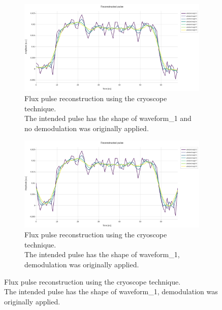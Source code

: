 \begin{figure}[h!]
    \centering
    \begin{subfigure}[t]{0.495\textwidth}
        \includegraphics[width=\textwidth]{figures/png/Cryoscope/no_demod/amplitude_windows.png}
        \caption{Flux pulse reconstruction using the cryoscope technique.\\
        The intended pulse has the shape of waveform\_1 and no demodulation was originally applied.}
        \label{fig:amplitude:step_dem}
    \end{subfigure}
    \hfill
    \begin{subfigure}[t]{0.495\textwidth}
        \includegraphics[width=\textwidth]{figures/png/Cryoscope/demodulation/amplitude_windows.png}
        \caption{Flux pulse reconstruction using the cryoscope technique.\\
        The intended pulse has the shape of waveform\_1, demodulation was originally applied.}
        \label{fig:amplitude:step_no_dem}
    \end{subfigure}

    \vspace{0.5cm}


\end{figure}
